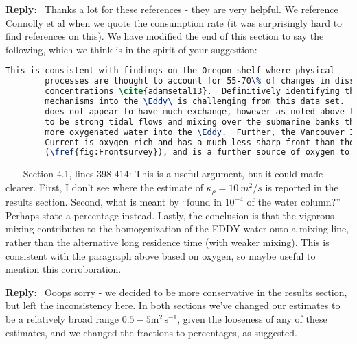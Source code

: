 \documentclass[11pt]{article}
\newcounter{reviewer}
\newcounter{point}[reviewer]
\renewcommand{\thepoint}{P\,\thereviewer.\arabic{point}}
\newenvironment{point}
   {\refstepcounter{point} \bigskip \noindent {\textbf{Reviewer~Point~\thepoint} } ---\ }
   {\par }
\newenvironment{reply}
   {\medskip \noindent \begin{sf}\textbf{Reply}:\  }
   {\medskip \end{sf}}
\begin{document}
\begin{reply}
    Thanks a lot for these references - they are very helpful.  We reference Connolly et al when we quote the consumption rate (it was surprisingly hard to find references on this).  We have modified the end of this section to say the following, which we think is in the spirit of your suggestion:

    \begin{lstlisting}[language=TeX, basicstyle=\small]
        This is consistent with findings on the Oregon shelf where physical
        processes are thought to account for 55-70\% of changes in dissolved oxygen
        concentrations \cite{adamsetal13}.  Definitively identifying the exchange
        mechanisms into the \Eddy\ is challenging from this data set.  The offshore front
        does not appear to have much exchange, however as noted above there does appear
        to be strong tidal flows and mixing over the submarine banks that can transport
        more oxygenated water into the \Eddy.  Further, the Vancouver Island Coastal
        Current is oxygen-rich and has a much less sharp front than the offshore front
        (\fref{fig:Frontsurvey}), and is a further source of oxygen to the \Eddy.
    \end{lstlisting}

\end{reply}

\begin{point}
    Section 4.1, lines 398-414: This is a useful argument,
    but it could made clearer. First, I don't see where the estimate of $\kappa_\rho = 10\ m^2/s$ is reported in the
    results section. Second, what is meant by ``found in $10^{-4}$ of the water column?'' Perhaps state a percentage instead. Lastly, the conclusion is that the vigorous mixing contributes to the homogenization of the EDDY water onto a mixing line, rather than the alternative long residence time (with weaker mixing). This is consistent with the paragraph above based on oxygen, so maybe useful to mention this corroboration.
\end{point}

\begin{reply}
    Ooops sorry - we decided to be more conservative in the results section, but left the inconsistency here.  In both sections we've changed our estimates to be a relatively broad range $0.5-5 \mathrm{m^2\,s^{-1}}$, given the looseness of any of these estimates, and we changed the fractions to percentages, as suggested.
\end{reply}
\end{document}
